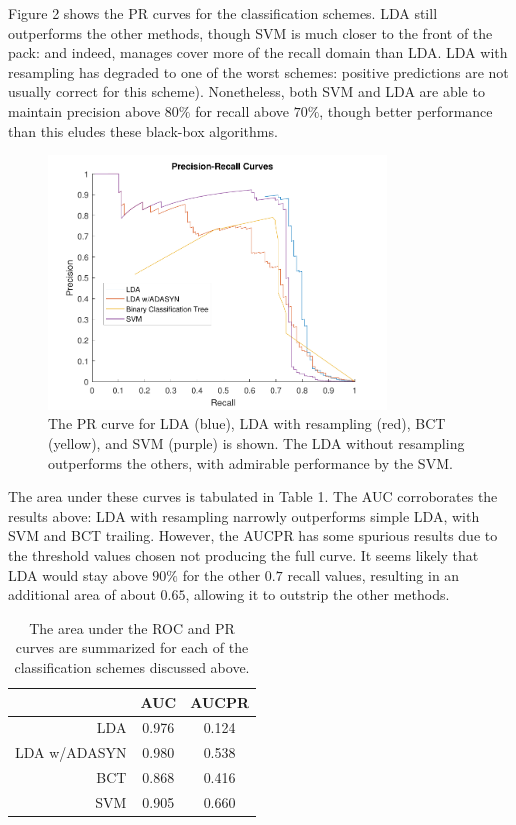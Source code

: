 \documentclass{article}
\begin{document}
Figure 2 shows the PR curves for the classification schemes. LDA still outperforms the other methods, though SVM is much closer to the front of the pack: and indeed, manages cover more of the recall domain than LDA. LDA with resampling has degraded to one of the worst schemes: positive predictions are not usually correct for this scheme). Nonetheless, both SVM and LDA are able to maintain precision above $80\%$ for recall above $70\%$, though better performance than this eludes these black-box algorithms.
\begin{figure}[!t]
	\centering
	\includegraphics[width=0.8\textwidth]{PR}
	\caption{The PR curve for LDA (blue), LDA with resampling (red), BCT (yellow), and SVM (purple) is shown. The LDA without resampling outperforms the others, with admirable performance by the SVM.}
	\label{fig:pr}
\end{figure}

The area under these curves is tabulated in Table 1. The AUC corroborates the results above: LDA with resampling narrowly outperforms simple LDA, with SVM and BCT trailing. However, the AUCPR has some spurious results due to the threshold values chosen not producing the full curve. It seems likely that LDA would stay above $90\%$ for the other $0.7$ recall values, resulting in an additional area of about $0.65$, allowing it to outstrip the other methods.
\begin{table}[!htb]
	\centering
	\caption{The area under the ROC and PR curves are summarized for each of the classification schemes discussed above.}
	\label{tab:area}
	\begin{tabular}{r|c|c}
		& AUC & AUCPR \\
		\hline
		LDA & 0.976 & 0.124 \\
		LDA w/ADASYN & 0.980 & 0.538 \\
		BCT  & 0.868 & 0.416 \\
		SVM & 0.905 & 0.660
	\end{tabular}
\end{table}
\end{document}
